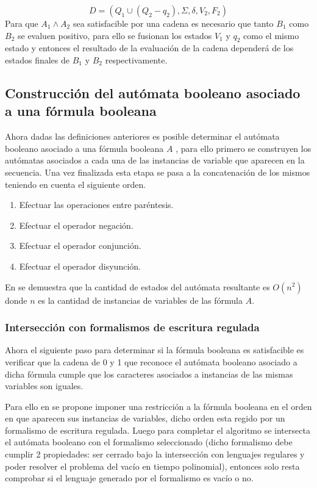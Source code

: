 \documentclass{article}
\begin{document}
$$
      D=(Q_1\cup (Q_2-q_2),\Sigma,\delta,V_2, F_2)
$$
Para que $A_1 \wedge A_2$ sea satisfacible por una cadena es necesario que tanto $B_1$ como $B_2$ se evaluen positivo, para
ello se fusionan los estados $V_1$ y $q_2$ como el mismo estado y entonces el resultado de la evaluación de la cadena dependerá
de los estados finales de $B_1$ y $B_2$ respectivamente.

\subsection{Construcción del autómata booleano asociado a una fórmula booleana}

Ahora dadas las definiciones anteriores es posible determinar el autómata booleano asociado a una fórmula booleana $A$ \cite{aCFSAT},
para ello primero se construyen los autómatas asociados a cada una de las instancias de variable que
aparecen en la secuencia. Una vez finalizada esta etapa se pasa a la concatenación de los
mismos teniendo en cuenta el siguiente orden.

\begin{enumerate}
      \item Efectuar las operaciones entre paréntesis.
      \item  Efectuar el operador negación.
      \item  Efectuar el operador conjunción.
      \item  Efectuar el operador disyunción.
\end{enumerate}

En \cite{aCFSAT} se demuestra que la cantidad de estados del autómata resultante es $O(n^2)$ donde $n$ es la cantidad de instancias
de variables de las fórmula $A$.

\subsubsection{Intersección con formalismos de escritura regulada}

Ahora el siguiente paso para determinar si la fórmula booleana es satisfacible es verificar
que la cadena de 0 y 1 que reconoce el autómata booleano asociado a dicha fórmula cumple que los caracteres
asociados a instancias de las mismas variables son iguales.

Para ello en \cite{aCFSAT} se propone imponer una restricción a la fórmula booleana en el orden en que aparecen sus
instancias de variables, dicho orden esta regido por un formalismo de escritura regulada. Luego para completar
el algoritmo se intersecta el autómata booleano con el formalismo seleccionado (dicho formalismo debe cumplir 2 propiedades:
ser cerrado bajo la intersección con lenguajes regulares y poder resolver el problema del vacío en tiempo polinomial), entonces
solo resta comprobar si el lenguaje generado por el formalismo es vacío o no.
\end{document}
